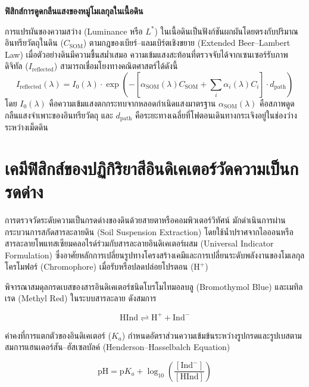 \begin{theorybox}
\textbf{ฟิสิกส์การดูดกลืนแสงของหมู่โมเลกุลในเนื้อดิน}\par
การแปรผันของความสว่าง (Luminance หรือ $L^*$) ในเนื้อดินเป็นฟังก์ชันผกผันโดยตรงกับปริมาณอินทรียวัตถุในดิน ($C_{\text{SOM}}$) ตามกฎของเบียร์--แลมเบิร์ตเชิงขยาย (Extended Beer--Lambert Law) เมื่อตัวอย่างดินมีความชื้นสม่ำเสมอ ความเข้มแสงสะท้อนที่ตรวจจับได้จากเซนเซอร์รับภาพดิจิทัล ($I_{\text{reflected}}$) สามารถเชื่อมโยงทางคณิตศาสตร์ได้ดังนี้
\begin{equation}
I_{\text{reflected}}(\lambda) = I_0(\lambda) \cdot \exp\left( - \left[ \alpha_{\text{SOM}}(\lambda) C_{\text{SOM}} + \sum_i \alpha_i(\lambda) C_i \right] \cdot d_{\text{path}} \right)
\end{equation}
โดย $I_0(\lambda)$ คือความเข้มแสงตกกระทบจากหลอดกำเนิดแสงมาตรฐาน $\alpha_{\text{SOM}}(\lambda)$ คือสภาพดูดกลืนแสงจำเพาะของอินทรียวัตถุ และ $d_{\text{path}}$ คือระยะทางเฉลี่ยที่โฟตอนเดินทางกระเจิงอยู่ในช่องว่างระหว่างเม็ดดิน
\end{theorybox}

\section{เคมีฟิสิกส์ของปฏิกิริยาสีอินดิเคเตอร์วัดความเป็นกรดด่าง}

การตรวจวัดระดับความเป็นกรดด่างของดินด้วยสายตาหรือคอมพิวเตอร์วิทัศน์ มักดำเนินการผ่านกระบวนการสกัดสารละลายดิน (Soil Suspension Extraction) โดยใช้น้ำปราศจากไอออนหรือสารละลายโพแทสเซียมคลอไรด์ร่วมกับสารละลายอินดิเคเตอร์ผสม (Universal Indicator Formulation) ซึ่งอาศัยหลักการเปลี่ยนรูปทางโครงสร้างเคมีและการเปลี่ยนระดับพลังงานของโมเลกุลโครโมฟอร์ (Chromophore) เมื่อรับหรือปลดปล่อยโปรตอน ($\text{H}^+$)

พิจารณาสมดุลกรดเบสของสารอินดิเคเตอร์ชนิดโบรโมไทมอลบลู (Bromothymol Blue) และเมทิลเรด (Methyl Red) ในระบบสารละลาย ดังสมการ

\begin{equation}
\text{H}\text{Ind} \rightleftharpoons \text{H}^+ + \text{Ind}^-
\end{equation}

ค่าคงที่การแตกตัวของอินดิเคเตอร์ ($K_a$) กำหนดอัตราส่วนความเข้มข้นระหว่างรูปกรดและรูปเบสตามสมการแฮนเดอร์สัน--ฮัสเซลบัลค์ (Henderson--Hasselbalch Equation)

\begin{equation}
\text{pH} = \text{p}K_a + \log_{10}\left( \frac{[\text{Ind}^-]}{[\text{H}\text{Ind}]} \right)
\label{eq:henderson}
\end{equation}

